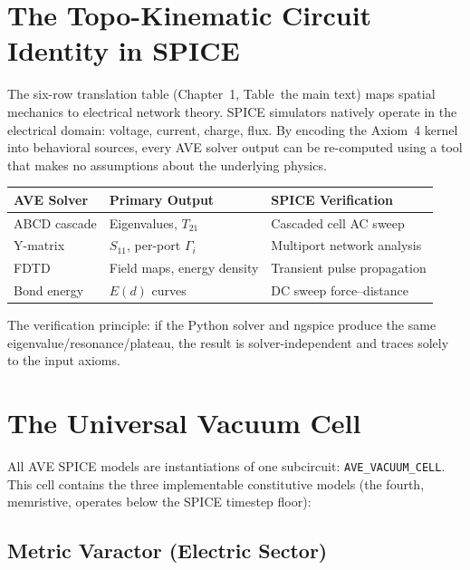 \section{The Topo-Kinematic Circuit Identity in SPICE}
\label{sec:spice_topo_kinematic}

The six-row translation table (Chapter~1, Table~the main text)
maps spatial mechanics to electrical network theory.  SPICE simulators
natively operate in the electrical domain: voltage, current, charge, flux.
By encoding the Axiom~4 kernel into behavioral sources, every AVE solver
output can be re-computed using a tool that makes no assumptions about
the underlying physics.

\begin{center}
\renewcommand{\arraystretch}{1.3}
\begin{tabular}{l l l}
\toprule
\textbf{AVE Solver} & \textbf{Primary Output} & \textbf{SPICE Verification} \\
\midrule
ABCD cascade      & Eigenvalues, $T_{21}$              & Cascaded cell AC sweep \\
Y-matrix          & $S_{11}$, per-port $\Gamma_i$      & Multiport network analysis \\
FDTD              & Field maps, energy density          & Transient pulse propagation \\
Bond energy       & $E(d)$ curves                       & DC sweep force--distance \\
\bottomrule
\end{tabular}
\end{center}

\noindent The verification principle: if the Python solver and ngspice
produce the same eigenvalue/resonance/plateau, the result is
solver-independent and traces solely to the input axioms.


\section{The Universal Vacuum Cell}
\label{sec:universal_cell}

All AVE SPICE models are instantiations of one subcircuit:
\texttt{AVE\_VACUUM\_CELL}.  This cell contains the three
implementable constitutive models (the fourth, memristive, operates
below the SPICE timestep floor):

\subsection{Metric Varactor (Electric Sector)}

